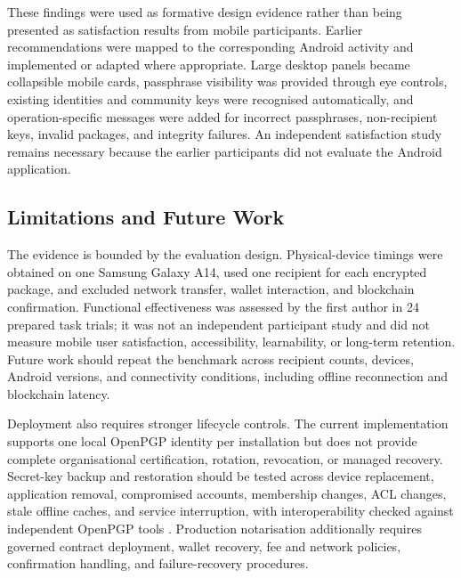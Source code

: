 \documentclass[]{interact}
\begin{document}
These findings were used as formative design evidence rather than being presented as satisfaction results from mobile participants. Earlier recommendations were mapped to the corresponding Android activity and implemented or adapted where appropriate. Large desktop panels became collapsible mobile cards, passphrase visibility was provided through eye controls, existing identities and community keys were recognised automatically, and operation-specific messages were added for incorrect passphrases, non-recipient keys, invalid packages, and integrity failures. An independent satisfaction study remains necessary because the earlier participants did not evaluate the Android application.

\subsection{Limitations and Future Work}

The evidence is bounded by the evaluation design. Physical-device timings were obtained on one Samsung Galaxy A14, used one recipient for each encrypted package, and excluded network transfer, wallet interaction, and blockchain confirmation. Functional effectiveness was assessed by the first author in 24 prepared task trials; it was not an independent participant study and did not measure mobile user satisfaction, accessibility, learnability, or long-term retention. Future work should repeat the benchmark across recipient counts, devices, Android versions, and connectivity conditions, including offline reconnection and blockchain latency.

Deployment also requires stronger lifecycle controls. The current implementation supports one local OpenPGP identity per installation but does not provide complete organisational certification, rotation, revocation, or managed recovery. Secret-key backup and restoration should be tested across device replacement, application removal, compromised accounts, membership changes, ACL changes, stale offline caches, and service interruption, with interoperability checked against independent OpenPGP tools \citep{wouters2024openpgp,nextgis2026permissions}. Production notarisation additionally requires governed contract deployment, wallet recovery, fee and network policies, confirmation handling, and failure-recovery procedures.
\end{document}

